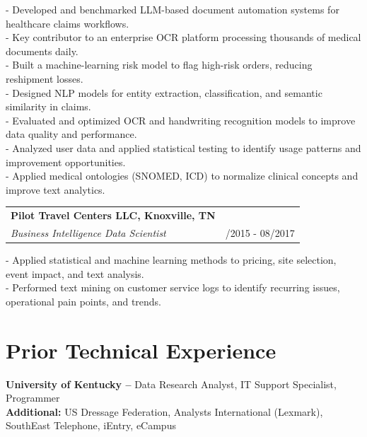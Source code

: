 \documentclass[a4paper,10pt]{article}
\begin{document}
\noindent
- Developed and benchmarked LLM-based document automation systems for healthcare claims workflows.\\
- Key contributor to an enterprise OCR platform processing thousands of medical documents daily.\\
- Built a machine-learning risk model to flag high-risk orders, reducing reshipment losses.\\
- Designed NLP models for entity extraction, classification, and semantic similarity in claims.\\
- Evaluated and optimized OCR and handwriting recognition models to improve data quality and performance.\\
- Analyzed user data and applied statistical testing to identify usage patterns and improvement opportunities.\\
- Applied medical ontologies (SNOMED, ICD) to normalize clinical concepts and improve text analytics.\\

\vspace{-9pt} %
\noindent\begin{tabularx}{\linewidth}{@{}>{\raggedright\arraybackslash}X >{\raggedleft\arraybackslash}p{1.55in}@{}}
\textbf{Pilot Travel Centers LLC, Knoxville, TN} &   \\[0pt]
\textit{Business Intelligence Data Scientist} & 05/2015 - 08/2017 \\
\end{tabularx}
\vspace{-6pt} %

\noindent
- Applied statistical and machine learning methods to pricing, site selection, event impact, and text analysis.\\
- Performed text mining on customer service logs to identify recurring issues, operational pain points, and trends.\\
\vspace{-7pt} %

\section*{Prior Technical Experience}
\noindent
\textbf{University of Kentucky --} Data Research Analyst, IT Support Specialist, Programmer\\
\textbf{Additional:} US Dressage Federation, Analysts International (Lexmark), SouthEast Telephone, iEntry, eCampus
\end{document}
